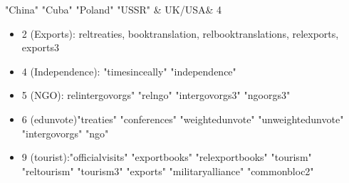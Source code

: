 \documentclass{article}
\begin{document}
\begin{appendices}
\begin{tabular}[ccc]
 "China"   "Cuba" "Poland"   "USSR" & UK/USA& 4
\end{tabular}

\begin{itemize}
\item 2 (Exports): reltreaties, booktranslation, relbooktranslations, relexports, exports3
\item 4 (Independence): "timesinceally"  "independence" 
\item 5 (NGO): relintergovorgs"          "relngo"   "intergovorgs3"        "ngoorgs3" 
\item 6 (edunvote)"treaties"      "conferences"   "weightedunvote" "unweightedunvote" "intergovorgs"              "ngo" 
\item 9 (tourist):"officialvisits"      "exportbooks"   "relexportbooks"          "tourism" "reltourism"         "tourism3"          "exports" "militaryalliance" 
 "commonbloc2" 

\end{itemize}



\end{appendices}
\end{document}
